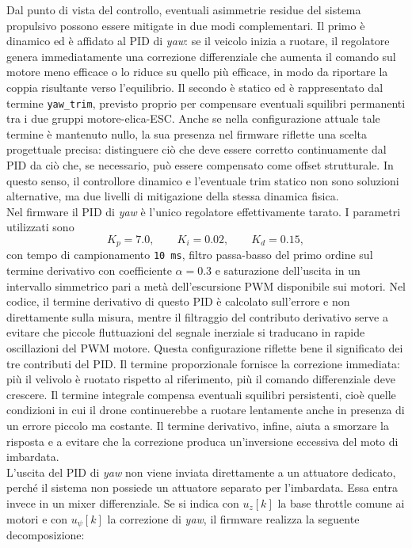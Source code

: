 \documentclass[11pt]{report}
\begin{document}
	Dal punto di vista del controllo, eventuali asimmetrie residue del sistema propulsivo possono essere mitigate in due modi complementari. Il primo è dinamico ed è affidato al PID di \textit{yaw}: se il veicolo inizia a ruotare, il regolatore genera immediatamente una correzione differenziale che aumenta il comando sul motore meno efficace o lo riduce su quello più efficace, in modo da riportare la coppia risultante verso l'equilibrio. Il secondo è statico ed è rappresentato dal termine \texttt{yaw\_trim}, previsto proprio per compensare eventuali squilibri permanenti tra i due gruppi motore-elica-ESC. Anche se nella configurazione attuale tale termine è mantenuto nullo, la sua presenza nel firmware riflette una scelta progettuale precisa: distinguere ciò che deve essere corretto continuamente dal PID da ciò che, se necessario, può essere compensato come offset strutturale. In questo senso, il controllore dinamico e l'eventuale trim statico non sono soluzioni alternative, ma due livelli di mitigazione della stessa dinamica fisica.\\
	Nel firmware il PID di \textit{yaw} è l'unico regolatore effettivamente tarato. I parametri utilizzati sono
	\begin{equation}
		K_p = 7.0, \qquad K_i = 0.02, \qquad K_d = 0.15,
	\end{equation}
	con tempo di campionamento \texttt{10 ms}, filtro passa-basso del primo ordine sul termine derivativo con coefficiente $\alpha = 0.3$ e saturazione dell'uscita in un intervallo simmetrico pari a metà dell'escursione PWM disponibile sui motori. Nel codice, il termine derivativo di questo PID è calcolato sull'errore e non direttamente sulla misura, mentre il filtraggio del contributo derivativo serve a evitare che piccole fluttuazioni del segnale inerziale si traducano in rapide oscillazioni del PWM motore. Questa configurazione riflette bene il significato dei tre contributi del PID. Il termine proporzionale fornisce la correzione immediata: più il velivolo è ruotato rispetto al riferimento, più il comando differenziale deve crescere. Il termine integrale compensa eventuali squilibri persistenti, cioè quelle condizioni in cui il drone continuerebbe a ruotare lentamente anche in presenza di un errore piccolo ma costante. Il termine derivativo, infine, aiuta a smorzare la risposta e a evitare che la correzione produca un'inversione eccessiva del moto di imbardata.\\
	L'uscita del PID di \textit{yaw} non viene inviata direttamente a un attuatore dedicato, perché il sistema non possiede un attuatore separato per l'imbardata. Essa entra invece in un mixer differenziale. Se si indica con $u_z[k]$ la base throttle comune ai motori e con $u_{\psi}[k]$ la correzione di \textit{yaw}, il firmware realizza la seguente decomposizione:
\end{document}
